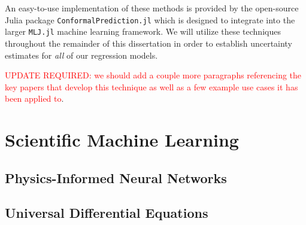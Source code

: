 An easy-to-use implementation of these methods is provided by the open-source Julia package \texttt{ConformalPrediction.jl} which is designed to integrate into the larger \texttt{MLJ.jl} machine learning framework. We will utilize these techniques throughout the remainder of this dissertation in order to establish uncertainty estimates for \textit{all} of our regression models.


\textcolor{red}{UPDATE REQUIRED: we should add a couple more paragraphs referencing the key papers that develop this technique as well as a few example use cases it has been applied to}.


\section{Scientific Machine Learning}
\subsection{Physics-Informed Neural Networks}
\subsection{Universal Differential Equations}







